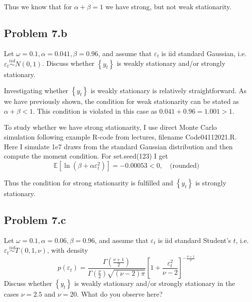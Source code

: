 \documentclass{EconHomework}
\begin{document}
Thus we know that for $\alpha+\beta=1$ we have strong, but not weak
stationarity.



\subsection{Problem 7.b}
\begin{tcolorbox}[colback=white]
    Let $\omega=0.1, \alpha=0.041, \beta=0.96$, and assume that $\varepsilon_{t}$ is iid standard Gaussian, i.e. $\varepsilon_{t} \stackrel{i i d}{\sim} N(0,1)$. Discuss whether $\left\{y_{t}\right\}$ is weakly stationary and/or strongly stationary.
\end{tcolorbox}

Investigating whether $\left\{ y_{t}\right\} $ is weakly stationary
is relatively straightforward. As we have previously shown, the condition
for weak stationarity can be stated as $\alpha+\beta<1$. This condition
is violated in this case as $0.041+0.96=1.001>1$. 

\bigskip

To study whether we have strong stationarity, I use direct Monte Carlo
simulation following example R-code from lectures, filename Code04112021.R.
Here I simulate 1e7 draws from the standard Gaussian distribution
and then compute the moment condition. For set.seed(123) I get 
\[
\mathbb{E}\left[\ln\left(\beta+\alpha\varepsilon_{t}^{2}\right)\right]=-0.00053<0,\quad\text{(rounded)}
\]

Thus the condition for strong stationarity is fulfilled and $\left\{ y_{t}\right\} $
is strongly stationary.

\pagebreak

\subsection{Problem 7.c}
\begin{tcolorbox}[colback=white]
    Let $\omega=0.1, \alpha=0.06, \beta=0.96$, and assume that $\varepsilon_{t}$ is iid standard Student's $t$, i.e. $\varepsilon_{t} \stackrel{i i d}{\sim} T(0,1, \nu)$, with density
    $$
    p\left(\varepsilon_{t}\right)=\frac{\Gamma\left(\frac{\nu+1}{2}\right)}{\Gamma\left(\frac{\nu}{2}\right) \sqrt{(\nu-2) \pi}}\left[1+\frac{\varepsilon_{t}^{2}}{\nu-2}\right]^{-\frac{\nu+1}{2}}
    $$
    Discuss whether $\left\{y_{t}\right\}$ is weakly stationary and/or strongly stationary in the cases $\nu=2.5$ and $\nu=20$. What do you observe here?
\end{tcolorbox}
\end{document}
